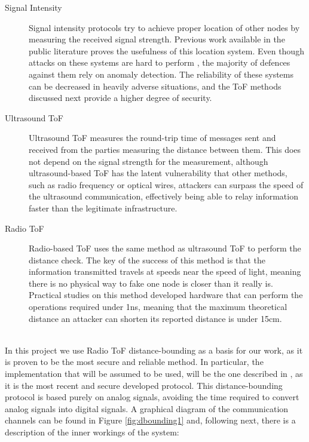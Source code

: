 \documentclass{article}
\begin{document}
\begin{description}
  \item[Signal Intensity] Signal intensity protocols try to achieve proper location of other nodes by measuring the received signal strength. Previous work available in the public literature\cite{seshadri2005bayesian} proves the usefulness of this location system. Even though attacks on these systems are hard to perform \cite{sheng2008detecting}, the majority of defences against them rely on anomaly detection. The reliability of these systems can be decreased in heavily adverse situations, and the ToF methods discussed next provide a higher degree of security.\\
  \item[Ultrasound ToF] Ultrasound ToF measures the round-trip time of messages sent and received from the parties measuring the distance between them. This does not depend on the signal strength for the measurement, although ultrasound-based ToF has the latent vulnerability that other methods, such as radio frequency or optical wires, attackers can surpass the speed of the ultrasound communication, effectively being able to relay information faster than the legitimate infrastructure\cite{capkun2006secure}.\\
  \item[Radio ToF] Radio-based ToF uses the same method as ultrasound ToF to perform the distance check. The key of the success of this method is that the information transmitted travels at speeds near the speed of light, meaning there is no physical way to fake one node is closer than it really is. Practical studies on this method \cite{rasmussen2010realization} developed hardware that can perform the operations required under 1ns, meaning that the maximum theoretical distance an attacker can shorten its reported distance is under 15cm.\\\
\end{description}

In this project we use Radio ToF distance-bounding as a basis for our work, as it is proven to be the most secure and reliable method. In particular, the implementation that will be assumed to be used, will be the one described in \cite{rasmussen2010realization}, as it is the most recent and secure developed protocol. This distance-bounding protocol is based purely on analog signals, avoiding the time required to convert analog signals into digital signals. A graphical diagram of the communication channels can be found in Figure \ref{fig:dbounding1} and, following next, there is a description of the inner workings of the system:\\
\end{document}
